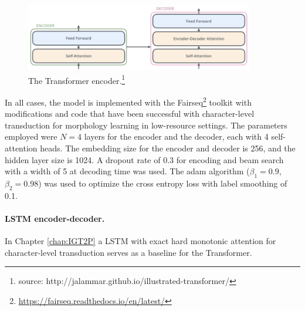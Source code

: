 \begin{figure}[t]
    \centering
    \includegraphics[width=10cm]{figs/Transformer_simplified.png}
    \caption[Transformer]{The Transformer encoder.\footnote{source: http://jalammar.github.io/illustrated-transformer/}}
    \label{fig:transformer}
\end{figure}

In all cases, the model is implemented with the Fairseq\footnote{\url{https://fairseq.readthedocs.io/en/latest/}} toolkit \citep{ott2019fairseq} with modifications and code \citep{wu2020applying} that have been successful with character-level transduction for morphology learning in low-resource settings. The parameters employed were $N=4$ layers for the encoder and the decoder, each with 4 self-attention heads. The embedding size for the encoder and decoder is 256, and the hidden layer size is 1024. A dropout rate of 0.3 for encoding and beam search with a width of 5 at decoding time was used. The adam algorithm \citep{kingma2014adam} ($\beta_1 = 0.9$, $\beta_2 = 0.98$) was used to optimize the cross entropy loss with label smoothing \citep{szegedy2016rethinking} of 0.1. 


\paragraph{LSTM encoder-decoder.} In Chapter \ref{chap:IGT2P} a LSTM with exact hard monotonic attention for character-level transduction \citep{wu-cotterell-2019-exact} serves as a baseline for the Transformer. 
